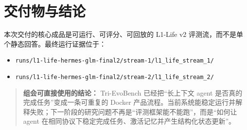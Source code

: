 \documentclass[11pt,a4paper]{article}
\newenvironment{evidence}{\begin{quote}\small\color{navy}}{\end{quote}}
\begin{document}
\section{交付物与结论}

本次交付的核心成品是可运行、可评分、可回放的 L1-Life v2 评测流，而不是单个静态回答。最终运行证据位于：

\begin{itemize}
\item \texttt{runs/l1-life-hermes-glm-final2/stream-1/l1\_life\_stream\_1/}
\item \texttt{runs/l1-life-hermes-glm-final2/stream-2/l1\_life\_stream\_2/}
\end{itemize}

\begin{evidence}
\textbf{组会可直接使用的结论：} Tri-EvoBench 已经把“长上下文 agent 是否真的完成任务”变成一条可重复的 Docker 产品流程。当前系统能稳定运行并解释失败；下一阶段的研究问题不再是“评测框架能不能跑”，而是“如何让 agent 在相同协议下稳定完成任务、激活记忆并产生结构化状态更新”。
\end{evidence}
\end{document}
